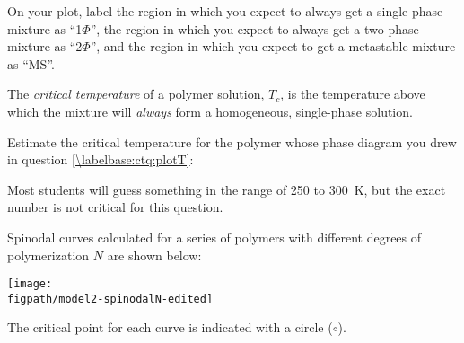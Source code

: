 \begin{activity}
\begin{ctqs}
		\begin{solution}[2in]
		\end{solution}
		
	\question On your plot, label the region in which you expect to always get a single-phase mixture as ``1$\Phi$'', the region in which you expect to always get a two-phase mixture as ``2$\Phi$'', and the region in which you expect to get a metastable mixture as ``MS''.
		
		
\end{ctqs}


\begin{infobox}

	The \emph{critical temperature} of a polymer solution, $T_c$, is the temperature above which the mixture will \emph{always} form a homogeneous, single-phase solution.

\end{infobox}


\begin{ctqs}
	\question Estimate the critical temperature for the polymer whose phase diagram you drew in question \ref{\labelbase:ctq:plotT}:
	
		\begin{solution}[0.25in]
		
			Most students will guess something in the range of 250 to 300~K, but the exact number is not critical for this question.
		
		\end{solution}
		
\end{ctqs}



\begin{model}
	\label{\labelbase:mdl:Ndependence}

	Spinodal curves calculated for a series of polymers with different degrees of polymerization $N$ are shown below:
	
	\centerline{\texttt{[image: \\figpath/model2-spinodalN-edited]}}
	
	The critical point for each curve is indicated with a circle ($\circ$).
	
\end{model}

\begin{ctqs}


\end{ctqs}
\end{activity}
